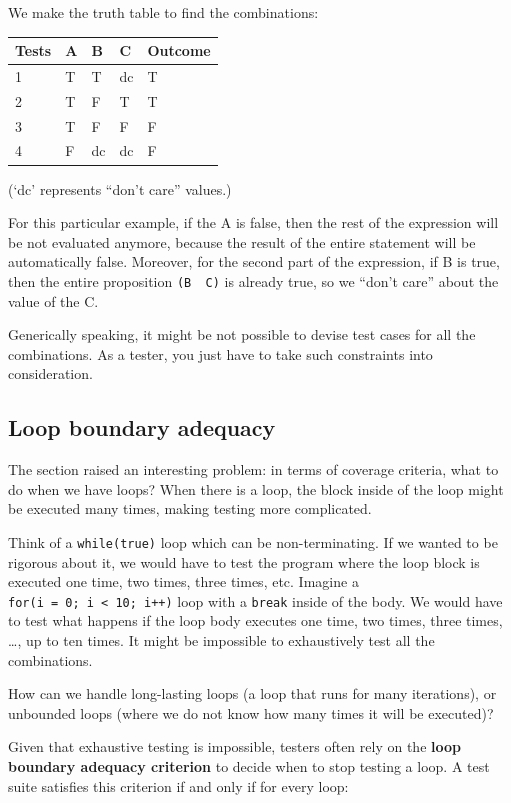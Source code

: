 We make the truth table to find the combinations:

\begin{longtable}[]{@{}lllll@{}}
\toprule
Tests & A & B & C & Outcome\tabularnewline
\midrule
\endhead
1 & T & T & dc & T\tabularnewline
2 & T & F & T & T\tabularnewline
3 & T & F & F & F\tabularnewline
4 & F & dc & dc & F\tabularnewline
\bottomrule
\end{longtable}

(`dc' represents ``don't care'' values.)

For this particular example, if the A is false, then the rest of the
expression will be not evaluated anymore, because the result of the
entire statement will be automatically false. Moreover, for the second
part of the expression, if B is true, then the entire proposition
\texttt{(B\ \textbar{}\textbar{}\ C)} is already true, so we ``don't
care'' about the value of the C.

Generically speaking, it might be not possible to devise test cases for
all the combinations. As a tester, you just have to take such
constraints into consideration.

\hypertarget{loop-boundary-adequacy}{%
\subsection{Loop boundary adequacy}\label{loop-boundary-adequacy}}

The section raised an interesting problem: in terms of coverage
criteria, what to do when we have loops? When there is a loop, the block
inside of the loop might be executed many times, making testing more
complicated.

Think of a \texttt{while(true)} loop which can be non-terminating. If we
wanted to be rigorous about it, we would have to test the program where
the loop block is executed one time, two times, three times, etc.
Imagine a \texttt{for(i\ =\ 0;\ i\ \textless{}\ 10;\ i++)} loop with a
\texttt{break} inside of the body. We would have to test what happens if
the loop body executes one time, two times, three times, \ldots, up to
ten times. It might be impossible to exhaustively test all the
combinations.

How can we handle long-lasting loops (a loop that runs for many
iterations), or unbounded loops (where we do not know how many times it
will be executed)?

Given that exhaustive testing is impossible, testers often rely on the
\textbf{loop boundary adequacy criterion} to decide when to stop testing
a loop. A test suite satisfies this criterion if and only if for every
loop:

